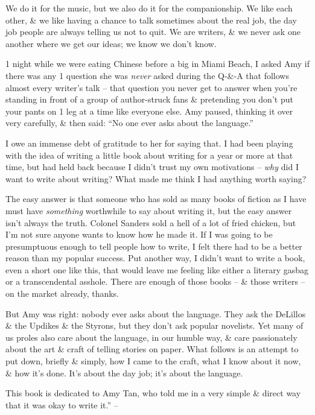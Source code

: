 \documentclass{article}
\numberwithin{equation}{section}
\begin{document}
We do it for the music, but we also do it for the companionship. We like each other, \& we like having a chance to talk sometimes about the real job, the day job people are always telling us not to quit. We are writers, \& we never ask one another where we get our ideas; we know we don't know.

1 night while we were eating Chinese before a big in Miami Beach, I asked Amy if there was any 1 question she was \textit{never} asked during the Q-\&-A that follows almost every writer's talk -- that question you never get to answer when you're standing in front of a group of author-struck fans \& pretending you don't put your pants on 1 leg at a time like everyone else. Amy paused, thinking it over very carefully, \& then said: ``No one ever asks about the language.''

I owe an immense debt of gratitude to her for saying that. I had been playing with the idea of writing a little book about writing for a year or more at that time, but had held back because I didn't trust my own motivations -- \textit{why} did I want to write about writing? What made me think I had anything worth saying?

The easy answer is that someone who has sold as many books of fiction as I have must have \textit{something} worthwhile to say about writing it, but the easy answer isn't always the truth. Colonel Sanders sold a hell of a lot of fried chicken, but I'm not sure anyone wants to know how he made it. If I was going to be presumptuous enough to tell people how to write, I felt there had to be a better reason than my popular success. Put another way, I didn't want to write a book, even a short one like this, that would leave me feeling like either a literary gasbag or a transcendental asshole. There are enough of those books -- \& those writers -- on the market already, thanks.

But Amy was right: nobody ever asks about the language. They ask the DeLillos \& the Updikes \& the Styrons, but they don't ask popular novelists. Yet many of us proles also care about the language, in our humble way, \& care passionately about the art \& craft of telling stories on paper. What follows is an attempt to put down, briefly \& simply, how I came to the craft, what I know about it now, \& how it's done. It's about the day job; it's about the language.

This book is dedicated to Amy Tan, who told me in a very simple \& direct way that it was okay to write it.'' -- \cite[p. 9]{King2010}
\end{document}
